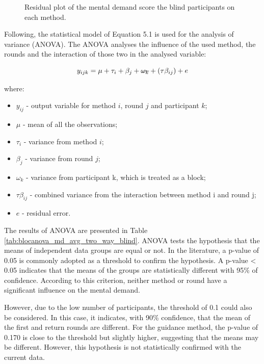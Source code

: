 \begin{figure}[!htb]
\begin{minipage}{0.45\textwidth}
        \caption{Residual plot of the mental demand score the blind participants on each method.}
        \label{fig:residplot_md_avg_two_way_blind}
    \end{minipage}
\end{figure}

Following, the statistical model of Equation 5.1 is used for the analysis of variance (ANOVA). The ANOVA analyses the influence of the used method, the rounds and the interaction of those two in the analysed variable: 

\begin{equation}
    \label{eq:statistical_model}
    y_{ijk} = \mu + \tau_i + \beta_j + \msout{\omega_k} + (\tau\beta_{ij}) + e
\end{equation}

where:

\begin{itemize}
    \item $y_{ij}$ - output variable for method $i$, round $j$ and participant $k$;
    \item $\mu$ - mean of all the observations;
    \item $\tau_i$ - variance from method $i$;
    \item $\beta_j$ - variance from round $j$;
    \item \sout{$\omega_k$} - variance from participant k, which is treated as a block;
    \item $\tau\beta_{ij}$ - combined variance from the interaction between method i and round j;
    \item $e$ - residual error.
\end{itemize}

The results of ANOVA are presented in Table \ref{tab:blocanova_md_avg_two_way_blind}. ANOVA tests the hypothesis that the means of independent data groups are equal or not. In the literature, a p-value of 0.05 is commonly adopted as a threshold to confirm the hypothesis. A p-value < 0.05 indicates that the means of the groups are statistically different with 95\% of confidence. According to this criterion, neither method or round have a significant influence on the mental demand.

However, due to the low number of participants, the threshold of 0.1 could also be considered. In this case, it indicates, with 90\% confidence, that the mean of the first and return rounds are different. For the guidance method, the p-value of 0.170 is close to the threshold but slightly higher, suggesting that the means may be different. However, this hypothesis is not statistically confirmed with the current data. 

